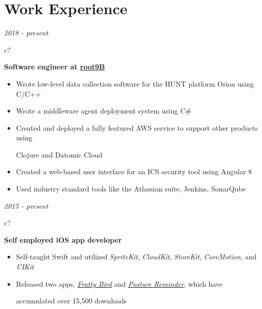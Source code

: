 \documentclass[12pt,a4paper,sans]{moderncv} %
\begin{document}
\vspace{-4 mm}
\section{Work Experience}

\textit{2018 - present}
\hspace{-1.7 mm}
\begin{tabular}{c?}
 \\
\end{tabular}
 \hspace{2 mm}
 \textbf{Software engineer at \href{https://www.root9b.com/}{root9B}}

 \vspace{-1 mm}
 \begin{itemize}
 \addtolength{\itemindent}{31.7 mm}
 \vspace{2 pt}
 \item{Wrote low-level data collection software for the HUNT platform Orion using C/C++}
 \item{Wrote a middleware agent deployment system using C\#}
 \item{Created and deployed a fully featured AWS service to support other products using 
 
 \hspace{30.5 mm} Clojure and Datomic Cloud}
 \item{Created a web-based user interface for an ICS security tool using Angular 8}
 \item{Used industry standard tools like the Atlassian suite, Jenkins, SonarQube}
 \end{itemize}
 
 
 \textit{2015 - present}
\hspace{-1.7 mm}
\begin{tabular}{c?}
 \\
\end{tabular}
 \hspace{2 mm}
 \textbf{Self employed iOS app developer} 
 
 \begin{itemize}
 \addtolength{\itemindent}{31.7 mm}
    \item Self-taught Swift and utilized \textit{SpriteKit}, \textit{CloudKit}, \textit{StoreKit}, \textit{CoreMotion}, and \textit{UIKit}
 \item Released two apps, \href{https://itunes.apple.com/us/app/fratty-bird-the-game/id1143642394?mt=8}{\textit{Fratty Bird}} and \href{https://itunes.apple.com/us/app/posture-reminder/id1280214465?mt=8}{\textit{Posture Reminder}}, which have 
 
   \hspace{30.5 mm}  accumulated over 15,500 downloads
   
 \end{itemize}
 
\end{document}
